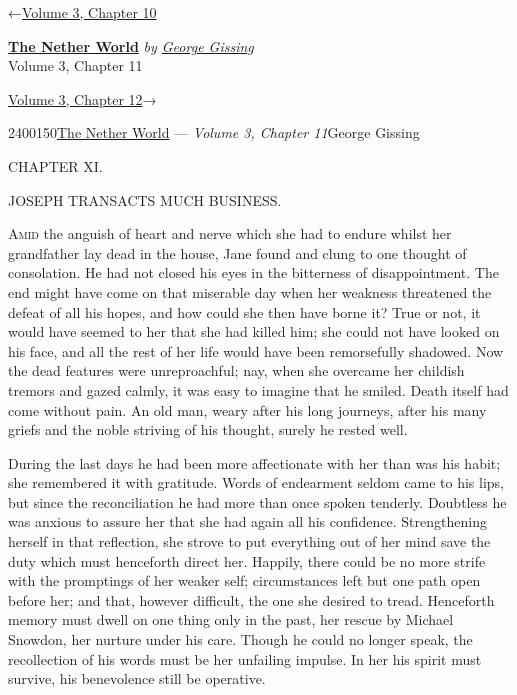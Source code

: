 \hypertarget{headerContainer}{}
\hypertarget{navigationHeader}{}
\protect\hypertarget{headerprevious}{}{←\href{/wiki/The_Nether_World/Volume_3/Chapter_10}{Volume
3, Chapter 10}}

\textbf{\protect\hypertarget{header_title_text}{}{\href{/wiki/The_Nether_World}{The
Nether World}}} \emph{by
\href{/wiki/Author:George_Gissing}{\protect\hypertarget{header_author_text}{}{{George
Gissing}}}}\\
\protect\hypertarget{header_section_text}{}{Volume 3, Chapter 11}

\protect\hypertarget{headernext}{}{\href{/wiki/The_Nether_World/Volume_3/Chapter_12}{Volume
3, Chapter 12}→}

\hypertarget{navigationNotes}{}

\hypertarget{ws-data}{}
\protect\hypertarget{ws-article-id}{}{2400150}\protect\hypertarget{ws-title}{}{\href{/wiki/The_Nether_World}{The
Nether World} --- \emph{Volume 3, Chapter
11}}\protect\hypertarget{ws-author}{}{George Gissing}

{\protect\hypertarget{217}{}{}}

{CHAPTER XI.}

JOSEPH TRANSACTS MUCH BUSINESS.

\textsc{Amid} the anguish of heart and nerve which she had to endure
whilst her grandfather lay dead in the house, Jane found and clung to
one thought of consolation. He had not closed his eyes in the bitterness
of disappointment. The end might have come on that miserable day when
her weakness threatened the defeat of all his hopes, and how could she
then have borne it? True or not, it would have seemed to her that she
had killed him; she could not have looked on his face, and all the rest
of her life would have been remorsefully shadowed. Now the dead features
were unreproachful; nay, when she overcame her childish tremors and
gazed calmly, it was easy to imagine that he smiled. Death itself had
come without pain. An old man, weary after his long journeys,
{\protect\hypertarget{218}{}{}}after his many griefs and the noble
striving of his thought, surely he rested well.

During the last days he had been more affectionate with her than was his
habit; she remembered it with gratitude. Words of endearment seldom came
to his lips, but since the reconciliation he had more than once spoken
tenderly. Doubtless he was anxious to assure her that she had again all
his confidence. Strengthening herself in that reflection, she strove to
put everything out of her mind save the duty which must henceforth
direct her. Happily, there could be no more strife with the promptings
of her weaker self; circumstances left but one path open before her; and
that, however difficult, the one she desired to tread. Henceforth memory
must dwell on one thing only in the past, her rescue by Michael Snowdon,
her nurture under his care. Though he could no longer speak, the
recollection of his words must be her unfailing impulse. In her his
spirit must survive, his benevolence still be operative.

